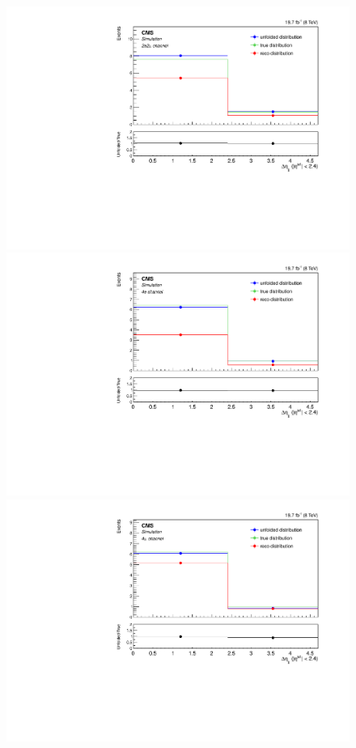 \begin{figure}[hbtp]
\begin{center}
    \includegraphics[width=0.8\cmsFigWidth]{Figures/Unfolding/MCTests/CentralDeta_ZZTo2e2m_MadMatrix_PowDistr_FullSample_fr}
     \includegraphics[width=0.8\cmsFigWidth]{Figures/Unfolding/MCTests/CentralDeta_ZZTo4e_PowMatrix_MadDistr_FullSample_fr}     
    \includegraphics[width=0.8\cmsFigWidth]{Figures/Unfolding/MCTests/CentralDeta_ZZTo4m_PowMatrix_MadDistr_FullSample_fr}     

\end{center}
\end{figure}
